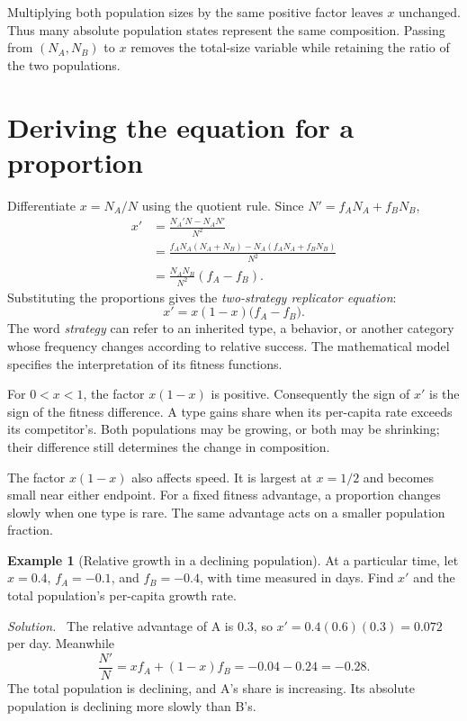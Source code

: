 \documentclass[11pt,oneside,openany]{book}
\theoremstyle{definition}
\newtheorem{example}{Example}[chapter]
\theoremstyle{remark}
\newenvironment{solution}{\par\smallskip\noindent\textit{Solution.}\ }{\par\smallskip}
\numberwithin{equation}{chapter}
\begin{document}
Multiplying both population sizes by the same positive factor leaves $x$ unchanged. Thus many absolute population states represent the same composition. Passing from $(N_A,N_B)$ to $x$ removes the total-size variable while retaining the ratio of the two populations.

\section{Deriving the equation for a proportion}
Differentiate $x=N_A/N$ using the quotient rule. Since $N'=f_A N_A+f_B N_B$,
\begin{align*}
x'&=\frac{N_A'N-N_A N'}{N^2}\\
&=\frac{f_A N_A(N_A+N_B)-N_A(f_A N_A+f_B N_B)}{N^2}\\
&=\frac{N_A N_B}{N^2}(f_A-f_B).
\end{align*}
Substituting the proportions gives the \emph{two-strategy replicator equation}:
\begin{equation}\label{eq:binaryrep}
\boxed{x'=x(1-x)\bigl(f_A-f_B\bigr).}
\end{equation}
The word \emph{strategy} can refer to an inherited type, a behavior, or another category whose frequency changes according to relative success. The mathematical model specifies the interpretation of its fitness functions.

For $0<x<1$, the factor $x(1-x)$ is positive. Consequently the sign of $x'$ is the sign of the fitness difference. A type gains share when its per-capita rate exceeds its competitor's. Both populations may be growing, or both may be shrinking; their difference still determines the change in composition.

The factor $x(1-x)$ also affects speed. It is largest at $x=1/2$ and becomes small near either endpoint. For a fixed fitness advantage, a proportion changes slowly when one type is rare. The same advantage acts on a smaller population fraction.

\begin{example}[Relative growth in a declining population]
At a particular time, let $x=0.4$, $f_A=-0.1$, and $f_B=-0.4$, with time measured in days. Find $x'$ and the total population's per-capita growth rate.
\begin{solution}
The relative advantage of A is $0.3$, so $x'=0.4(0.6)(0.3)=0.072$ per day. Meanwhile
\[
\frac{N'}{N}=xf_A+(1-x)f_B=-0.04-0.24=-0.28.
\]
The total population is declining, and A's share is increasing. Its absolute population is declining more slowly than B's.
\end{solution}
\end{example}
\end{document}
